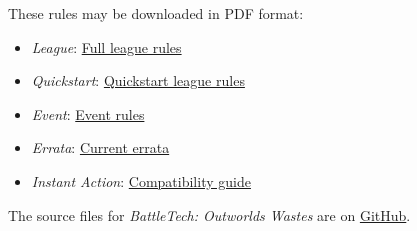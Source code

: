 
These rules may be downloaded in PDF format:


\begin{itemize}

\item \emph{League}: \href{https://raw.githubusercontent.com/Eudicods/outworlds-wastes-legacy/rules-pdf/battletech-outworlds-wastes.pdf}{Full league rules}

\item \emph{Quickstart}: \href{https://raw.githubusercontent.com/Eudicods/outworlds-wastes-legacy/rules-pdf/battletech-outworlds-wastes-quickstart.pdf}{Quickstart league rules}

\item \emph{Event}: \href{https://raw.githubusercontent.com/Eudicods/outworlds-wastes-legacy/rules-pdf/battletech-outworlds-wastes-event.pdf}{Event rules}

\item \emph{Errata}: \href{https://raw.githubusercontent.com/Eudicods/outworlds-wastes-legacy/rules-pdf/battletech-outworlds-wastes-errata.pdf}{Current errata}

\item \emph{Instant Action}: \href{https://raw.githubusercontent.com/Eudicods/outworlds-wastes-legacy/rules-pdf/battletech-outworlds-wastes-instant-action.pdf}{Compatibility guide}

\end{itemize}







The source files for \emph{BattleTech: Outworlds Wastes} are on \href{https://github.com/Eudicods/outworlds-wastes-legacy}{GitHub}.
